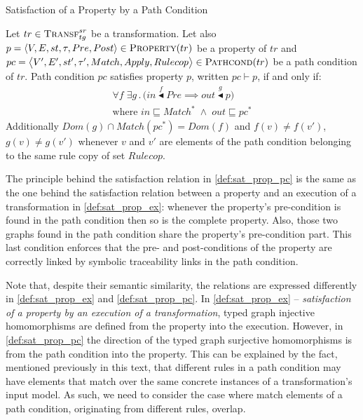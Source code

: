 \begin{definition}{Satisfaction of a Property by a Path Condition\\}
\label{def:sat_prop_pc}

Let $tr\in \textsc{Transf}^{sr}_{tg}$ be a transformation. Let also $p = \langle V,E,st,\tau,\\Pre,Post\rangle \in \textsc{Property}(tr)$ be a property of $tr$ and $pc=\big\langle V',E',\\st',\tau', Match,Apply,Rulecop\big\rangle\in \textsc{Pathcond}(tr)$ be a path condition of $tr$. Path condition $pc$ satisfies property $p$, written $pc \vdash p$, if and only if:
\begin{multline*}
\forall f\; \exists g\,.\,\big(in\stackrel{f}{\blacktriangleleft} Pre \implies out \stackrel{g}\blacktriangleleft p\big)\\
\text{where } in \sqsubseteq Match^{*} \;\land\; out \sqsubseteq pc^{*}
\end{multline*}
Additionally $Dom(g)\cap Match(pc^{*}) = Dom(f)$ and $f(v)\neq f(v')$, $g(v)\neq g(v')$ whenever $v$ and $v'$ are elements of the path condition belonging to the same rule copy of set $Rulecop$.

\end{definition}

The principle behind the satisfaction relation in \cref{def:sat_prop_pc} is the same as the one behind the satisfaction relation between a property and an execution of a transformation in \cref{def:sat_prop_ex}: whenever the property's pre-condition is found in the path condition then so is the complete property. Also, those two graphs found in the path condition share the property's pre-condition part. This last condition enforces that the pre- and post-conditions of the property are correctly linked by symbolic traceability links in the path condition.

Note that, despite their semantic similarity, the relations are expressed differently in \cref{def:sat_prop_ex} and \cref{def:sat_prop_pc}. In \cref{def:sat_prop_ex} -- \emph{satisfaction of a property by an execution of a transformation}, typed graph injective homomorphisms are defined from the property into the execution. However, in \cref{def:sat_prop_pc} the direction of the typed graph surjective homomorphisms is from the path condition into the property. This can be explained by the fact, mentioned previously in this text, that different rules in a path condition may have elements that match over the same concrete instances of a transformation's input model. As such, we need to consider the case where match elements of a path condition, originating from different rules, overlap. 

